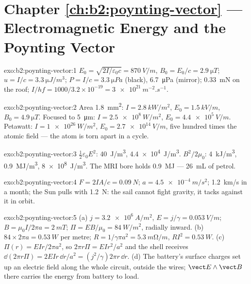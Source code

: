 \section*{Chapter \ref{ch:b2:poynting-vector} --- Electromagnetic Energy and the Poynting Vector}

\begin{solution}{exo:b2:poynting-vector:1}
$E_0 = \sqrt{2I/\varepsilon_0c} = \qty{870}{V/m}$, $B_0 = E_0/c = \qty{2.9}{\micro T}$; $u = I/c
= \qty{3.3}{\micro J/m^3}$; $P = I/c = \qty{3.3}{\micro Pa}$ (black), \qty{6.7}{\micro Pa}
(mirror); \qty{0.33}{mN} on the roof; $I/hf = 1000/3.2 \times 10^{-19} = \qty{3e21}{m^{-2}.s^{-1}}$.
\end{solution}

\begin{solution}{exo:b2:poynting-vector:2}
Area \qty{1.8}{mm^2}: $I = \qty{2.8}{kW/m^2}$, $E_0 = \qty{1.5}{kV/m}$, $B_0 = \qty{4.9}{\micro T}$.
Focused to \qty{5}{\micro m}: $I = \qty{2.5e8}{W/m^2}$, $E_0 = \qty{4.4e5}{V/m}$. Petawatt:
$I = \qty{1e26}{W/m^2}$, $E_0 = \qty{2.7e14}{V/m}$, five hundred times the atomic
field --- the atom is torn apart in a cycle.
\end{solution}

\begin{solution}{exo:b2:poynting-vector:3}
$\tfrac12\varepsilon_0E^2$: \qty{40}{J/m^3}, \qty{4.4e4}{J/m^3}. $B^2/2\mu_0$: \qty{4}{kJ/m^3},
\qty{0.9}{MJ/m^3}, \qty{8e8}{J/m^3}. The MRI bore holds \qty{0.9}{MJ} --- \qty{26}{mL}
of petrol.
\end{solution}

\begin{solution}{exo:b2:poynting-vector:4}
$F = 2IA/c = \qty{0.09}{N}$; $a = \qty{4.5e-4}{m/s^2}$; \qty{1.2}{km/s} in a month;
the Sun pulls with \qty{1.2}{N}: the sail cannot fight gravity, it tacks
against it in orbit.
\end{solution}

\begin{solution}{exo:b2:poynting-vector:5}
(a) $j = \qty{3.2e6}{A/m^2}$, $E = j/\gamma = \qty{0.053}{V/m}$; $B = \mu_0I/2\pi a = \qty{2}{mT}$;
$\Pi = EB/\mu_0 = \qty{84}{W/m^2}$, radially inward. (b) $84 \times 2\pi a = \qty{0.53}{W}$
per metre; $R = 1/\gamma\pi a^2 = \qty{5.3}{m\ohm/m}$, $RI^2 = \qty{0.53}{W}$. (c) $\Pi(r)
= EIr/2\pi a^2$, so $2\pi r\Pi = EIr^2/a^2$ and the shell receives $\dd(2\pi r\Pi)
= 2EIr\,\dd r/a^2 = (j^2/\gamma)2\pi r\,\dd r$. (d) The battery's surface charges
set up an electric field along the whole circuit, outside the wires;
$\vect E\wedge\vect B$ there carries the energy from battery to load.
\end{solution}

